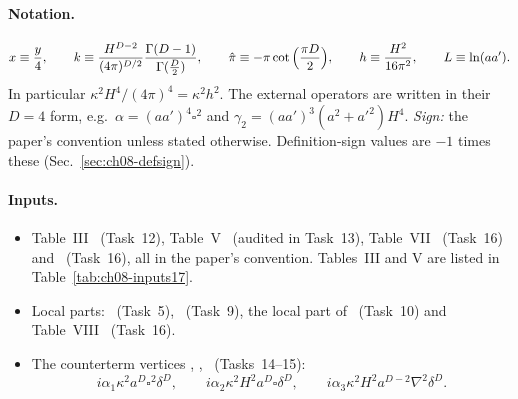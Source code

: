 \paragraph{Notation.}
\[
x\equiv\frac y4,\qquad k\equiv\frac{H^{D-2}}{(4\pi)^{D/2}}\frac{\Gamma(D-1)}{\Gamma(\frac D2)},\qquad \hat\pi\equiv-\pi\cot\Big(\frac{\pi D}{2}\Big),\qquad
h\equiv\frac{H^2}{16\pi^2},\qquad L\equiv\ln(aa') .
\]
In particular $\kappa^2H^4/(4\pi)^4=\kappa^2h^2$. The external operators are written in their $D=4$ form, e.g.\ $\alpha=(aa')^4\square^2$ and $\gamma_2=(aa')^3(a^2+a'^2)H^4$.
\emph{Sign:} the paper's convention unless stated otherwise. Definition-sign values are $-1$ times these (Sec.~\ref{sec:ch08-defsign}).

\paragraph{Inputs.}
\begin{itemize}[leftmargin=*,itemsep=2pt]
\item[(G1)] Table~III \tD\ (Task~12), Table~V \tP\ (audited in Task~13), Table~VII \tD\ (Task~16) and  \tD\ (Task~16), all in the paper's convention.
Tables~III and V are listed in Table~\ref{tab:ch08-inputs17}.
\item[(G2)] Local parts:  \tD\ (Task~5),  \tD\ (Task~9), the local part of  \tD\ (Task~10) and Table~VIII \tD\ (Task~16).
\item[(G3)] The counterterm vertices , ,  \tD\ (Tasks~14--15):
\[
i\alpha_1\kappa^2a^D\square^2\delta^D,\qquad i\alpha_2\kappa^2H^2a^D\square\delta^D,\qquad i\alpha_3\kappa^2H^2a^{D-2}\nabla^2\delta^D .
\]
\end{itemize}

